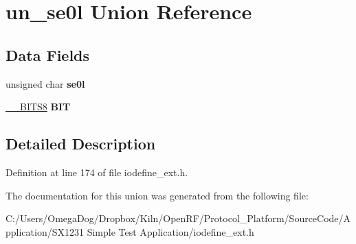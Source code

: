 \hypertarget{unionun__se0l}{\section{un\-\_\-se0l Union Reference}
\label{unionun__se0l}
}
\subsection*{Data Fields}
\begin{DoxyCompactItemize}
\item 
\hypertarget{unionun__se0l_a6e3509e2e3ce866a861ecf1255e18330}{unsigned char {\bfseries se0l}}\label{unionun__se0l_a6e3509e2e3ce866a861ecf1255e18330}

\item 
\hypertarget{unionun__se0l_adfb4b8fc6f3ddd29ef3e0ccec11e51d5}{\hyperlink{struct_____b_i_t_s8}{\-\_\-\-\_\-\-B\-I\-T\-S8} {\bfseries B\-I\-T}}\label{unionun__se0l_adfb4b8fc6f3ddd29ef3e0ccec11e51d5}

\end{DoxyCompactItemize}


\subsection{Detailed Description}


Definition at line 174 of file iodefine\-\_\-ext.\-h.



The documentation for this union was generated from the following file\-:\begin{DoxyCompactItemize}
\item 
C\-:/\-Users/\-Omega\-Dog/\-Dropbox/\-Kiln/\-Open\-R\-F/\-Protocol\-\_\-\-Platform/\-Source\-Code/\-Application/\-S\-X1231 Simple Test Application/iodefine\-\_\-ext.\-h\end{DoxyCompactItemize}
